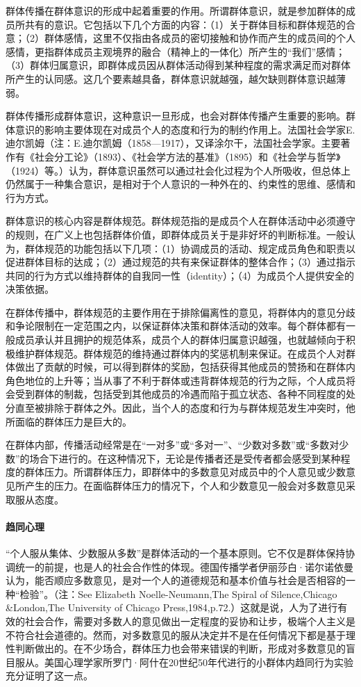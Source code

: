 \documentclass[UTF8,12pt]{ctexart}
\numberwithin{equation}{section} %
\numberwithin{figure}{section}
\numberwithin{table}{section}
\begin{document}
	群体传播在群体意识的形成中起着重要的作用。所谓群体意识，就是参加群体的成员所共有的意识。它包括以下几个方面的内容：（1）关于群体目标和群体规范的合意；（2）群体感情，这里不仅指由各成员的密切接触和协作而产生的成员间的个人感情，更指群体成员主观境界的融合（精神上的一体化）所产生的“我们”感情；（3）群体归属意识，即群体成员因从群体活动得到某种程度的需求满足而对群体所产生的认同感。这几个要素越具备，群体意识就越强，越欠缺则群体意识越薄弱。
	
	群体传播形成群体意识，这种意识一旦形成，也会对群体传播产生重要的影响。群体意识的影响主要体现在对成员个人的态度和行为的制约作用上。法国社会学家E.迪尔凯姆（注：E.迪尔凯姆（1858—1917），又译涂尔干，法国社会学家。主要著作有《社会分工论》（1893）、《社会学方法的基准》（1895）和《社会学与哲学》（1924）等。）认为，群体意识虽然可以通过社会化过程为个人所吸收，但总体上仍然属于一种集合意识，是相对于个人意识的一种外在的、约束性的思维、感情和行为方式。
	
	群体意识的核心内容是群体规范。群体规范指的是成员个人在群体活动中必须遵守的规则，在广义上也包括群体价值，即群体成员关于是非好坏的判断标准。一般认为，群体规范的功能包括以下几项：（1）协调成员的活动、规定成员角色和职责以促进群体目标的达成；（2）通过规范的共有来保证群体的整体合作；（3）通过指示共同的行为方式以维持群体的自我同一性（identity）；（4）为成员个人提供安全的决策依据。
	
	在群体传播中，群体规范的主要作用在于排除偏离性的意见，将群体内的意见分歧和争论限制在一定范围之内，以保证群体决策和群体活动的效率。每个群体都有一般成员承认并且拥护的规范体系，成员个人的群体归属意识越强，也就越倾向于积极维护群体规范。群体规范的维持通过群体内的奖惩机制来保证。在成员个人对群体做出了贡献的时候，可以得到群体的奖励，包括获得其他成员的赞扬和在群体内角色地位的上升等；当从事了不利于群体或违背群体规范的行为之际，个人成员将会受到群体的制裁，包括受到其他成员的冷遇而陷于孤立状态、各种不同程度的处分直至被排除于群体之外。因此，当个人的态度和行为与群体规范发生冲突时，他所面临的群体压力是巨大的。
	
	在群体内部，传播活动经常是在“一对多”或“多对一”、“少数对多数”或“多数对少数”的场合下进行的。在这种情况下，无论是传播者还是受传者都会感受到某种程度的群体压力。所谓群体压力，即群体中的多数意见对成员中的个人意见或少数意见所产生的压力。在面临群体压力的情况下，个人和少数意见一般会对多数意见采取服从态度。
	
	\paragraph{趋同心理}
	
	“个人服从集体、少数服从多数”是群体活动的一个基本原则。它不仅是群体保持协调统一的前提，也是人的社会合作性的体现。德国传播学者伊丽莎白·诺尔诺依曼认为，能否顺应多数意见，是对一个人的道德规范和基本价值与社会是否相容的一种“检验”。（注：See Elizabeth Noelle-Neumann,The Spiral of Silence,Chicago \&London,The University of Chicago Press,1984,p.72.）这就是说，人为了进行有效的社会合作，需要对多数人的意见做出一定程度的妥协和让步，极端个人主义是不符合社会道德的。然而，对多数意见的服从决定并不是在任何情况下都是基于理性判断做出的。在不少场合，群体压力也会带来错误的判断，形成对多数意见的盲目服从。美国心理学家所罗门·阿什在20世纪50年代进行的小群体内趋同行为实验充分证明了这一点。
	
\end{document}
